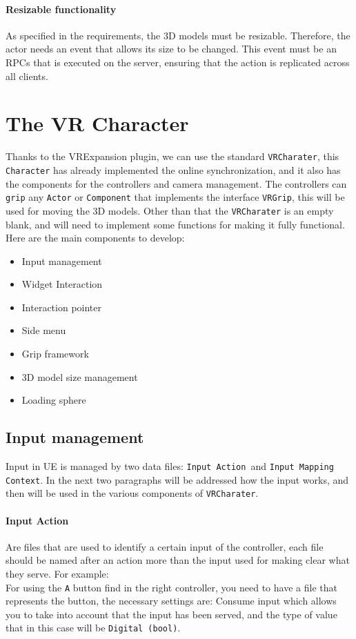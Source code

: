 \paragraph{Resizable functionality}
As specified in the requirements, the 3D models must be resizable. Therefore, the actor needs an event that allows its size to be changed. This event must be an \ac{RPCs} that is executed on the server, ensuring that the action is replicated across all clients.

\section{The VR Character}
\noindent
Thanks to the VRExpansion plugin, we can use the standard \texttt{VRCharater}, this \texttt{Character} has already implemented the online synchronization, and it also has the components for the controllers and camera management.
The controllers can \texttt{grip} any \texttt{Actor} or \texttt{Component} that implements the interface \texttt{VRGrip}, this will be used for  moving the 3D models.
Other than that the \texttt{VRCharater} is an empty blank, and will need to implement some functions for making it fully functional.\\
Here are the main components to develop:

\begin{itemize}
    \item Input management
    \item Widget Interaction
    \item Interaction pointer
    \item Side menu
    \item Grip framework
    \item 3D model size management    
    \item Loading sphere
\end{itemize}

\subsection{Input management}
\noindent
Input in \ac{UE} is managed by two data files: \texttt{Input Action }and \texttt{Input Mapping Context}.
In the next two paragraphs will be addressed how the input works, and then will be used in the various components of \texttt{VRCharater}.

\paragraph{Input Action}
Are files that are used to identify a certain input of the controller, each file should be named after an action more than the input used for making clear what they serve.
For example:\\
For using the \texttt{A} button find in the right controller,
you need to have a file that represents the button,
the necessary settings are: Consume input which allows you to take into account that the input has been served,
and the type of value that in this case will be \texttt{Digital (bool)}.


